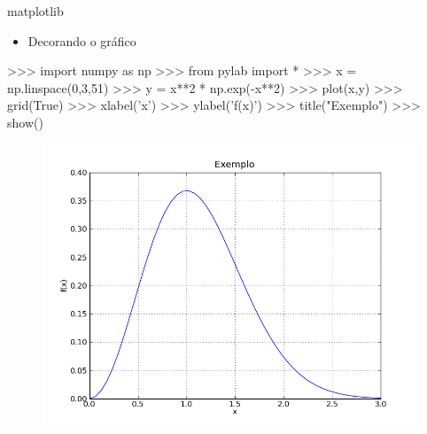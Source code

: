 \documentclass[12pt,t,graphics]{beamer}
\begin{document}
\begin{frame}[t,fragile]{matplotlib}
	\vspace{-0.5cm}
	\begin{itemize}
		\item Decorando o gráfico
	\end{itemize}
		\begin{python}
>>> import numpy as np
>>> from pylab import *
>>> x = np.linspace(0,3,51)
>>> y = x**2 * np.exp(-x**2)
>>> plot(x,y)
>>> grid(True)
>>> xlabel('x')
>>> ylabel('f(x)')
>>> title("Exemplo")
>>> show()
		\end{python}
		\begin{figure}
			\centering
			\includegraphics[scale=0.225]{img/plot2.png}
		\end{figure}		
\end{frame}
\end{document}
